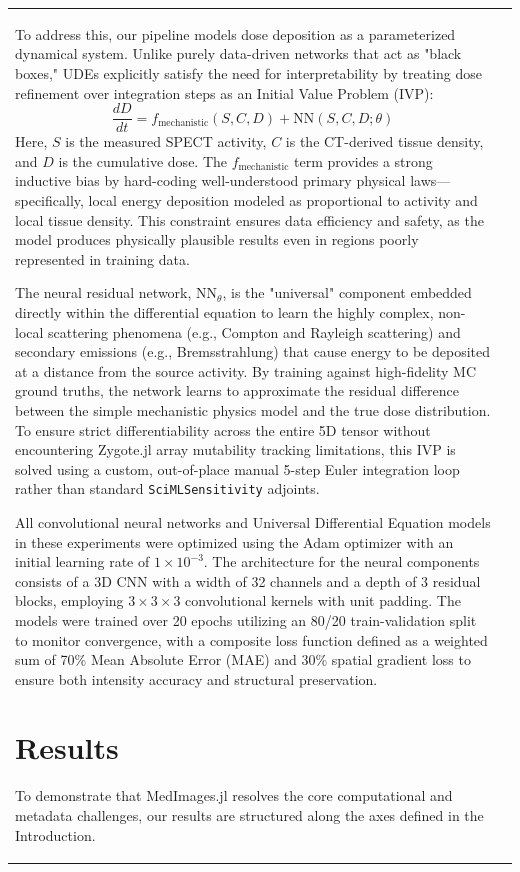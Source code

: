 \documentclass[10pt,letterpaper]{article}
\begin{document}
\begin{table}[H]
\begin{tabular}{|p{}|p{}|}
To address this, our pipeline models dose deposition as a parameterized dynamical system. Unlike purely data-driven networks that act as "black boxes," UDEs explicitly satisfy the need for interpretability by treating dose refinement over integration steps as an Initial Value Problem (IVP):
\begin{equation}
\frac{dD}{dt} = f_{\text{mechanistic}}(S, C, D) + \text{NN}(S, C, D; \theta)
\end{equation}
Here, $S$ is the measured SPECT activity, $C$ is the CT-derived tissue density, and $D$ is the cumulative dose. The $f_{\text{mechanistic}}$ term provides a strong inductive bias by hard-coding well-understood primary physical laws—specifically, local energy deposition modeled as proportional to activity and local tissue density. This constraint ensures data efficiency and safety, as the model produces physically plausible results even in regions poorly represented in training data. 

The neural residual network, $\text{NN}_{\theta}$, is the "universal" component embedded directly within the differential equation to learn the highly complex, non-local scattering phenomena (e.g., Compton and Rayleigh scattering) and secondary emissions (e.g., Bremsstrahlung) that cause energy to be deposited at a distance from the source activity. By training against high-fidelity MC ground truths, the network learns to approximate the residual difference between the simple mechanistic physics model and the true dose distribution. To ensure strict differentiability across the entire 5D tensor without encountering Zygote.jl array mutability tracking limitations, this IVP is solved using a custom, out-of-place manual 5-step Euler integration loop rather than standard \texttt{SciMLSensitivity} adjoints.

All convolutional neural networks and Universal Differential Equation models in these experiments were optimized using the Adam optimizer with an initial learning rate of $1 \times 10^{-3}$. The architecture for the neural components consists of a 3D CNN with a width of 32 channels and a depth of 3 residual blocks, employing $3 \times 3 \times 3$ convolutional kernels with unit padding. The models were trained over 20 epochs utilizing an 80/20 train-validation split to monitor convergence, with a composite loss function defined as a weighted sum of 70\% Mean Absolute Error (MAE) and 30\% spatial gradient loss to ensure both intensity accuracy and structural preservation.

\section{Results}
To demonstrate that MedImages.jl resolves the core computational and metadata challenges, our results are structured along the axes defined in the Introduction.


\end{tabular}
\end{table}
\end{document}
